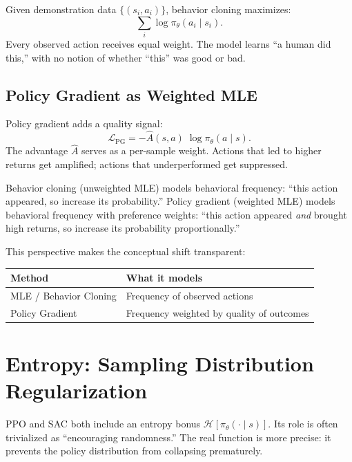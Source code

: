 Given demonstration data $\{(s_i, a_i)\}$, behavior cloning maximizes:
\begin{equation}
  \sum_i \log\pi_\theta(a_i \mid s_i).
\end{equation}
Every observed action receives equal weight. The model learns ``a human did this,'' with no notion of whether ``this'' was good or bad.

\subsection{Policy Gradient as Weighted MLE}

Policy gradient adds a quality signal:
\begin{equation}
  \mathcal{L}_{\text{PG}} = -\hat{A}(s,a)\;\log\pi_\theta(a \mid s).
\end{equation}
The advantage $\hat{A}$ serves as a per-sample weight. Actions that led to higher returns get amplified; actions that underperformed get suppressed.

\begin{keyidea}
Behavior cloning (unweighted MLE) models behavioral frequency: ``this action appeared, so increase its probability.'' Policy gradient (weighted MLE) models behavioral frequency with preference weights: ``this action appeared \emph{and} brought high returns, so increase its probability proportionally.''
\end{keyidea}

This perspective makes the conceptual shift transparent:
\begin{center}
\begin{tabular}{@{} l l @{}}
\toprule
\textbf{Method} & \textbf{What it models} \\
\midrule
MLE / Behavior Cloning & Frequency of observed actions \\
Policy Gradient & Frequency weighted by quality of outcomes \\
\bottomrule
\end{tabular}
\end{center}

\section{Entropy: Sampling Distribution Regularization}
\label{sec:entropy}

PPO and SAC both include an entropy bonus $\mathcal{H}[\pi_\theta(\cdot \mid s)]$. Its role is often trivialized as ``encouraging randomness.'' The real function is more precise: it prevents the policy distribution from collapsing prematurely.


